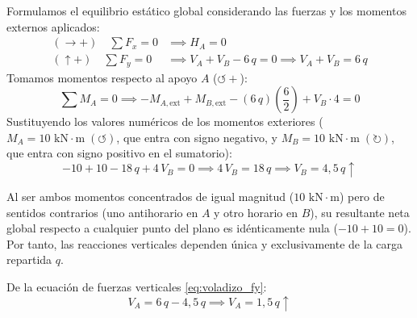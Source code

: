 Formulamos el equilibrio estático global considerando las fuerzas y los momentos externos aplicados:
\begin{align}
    (\rightarrow +) \quad \sum F_x = 0 & \implies \boxed{H_A = 0} \\[6pt]
    (\uparrow +) \quad \sum F_y = 0    & \implies V_A + V_B - 6\,q = 0 \implies V_A + V_B = 6\,q \label{eq:voladizo_fy}
\end{align}
Tomamos momentos respecto al apoyo $A$ ($\circlearrowleft +$):
\begin{equation}
    \sum M_A = 0 \implies -M_{A,\text{ext}} + M_{B,\text{ext}} - (6\,q)\left(\frac{6}{2}\right) + V_B \cdot 4 = 0
\end{equation}
Sustituyendo los valores numéricos de los momentos exteriores ($M_A = 10\text{ kN}\cdot\text{m}\;(\circlearrowleft)$, que entra con signo negativo, y $M_B = 10\text{ kN}\cdot\text{m}\;(\circlearrowright)$, que entra con signo positivo en el sumatorio):
\begin{equation}
    -10 + 10 - 18\,q + 4\,V_B = 0 \implies 4\,V_B = 18\,q \implies \boxed{V_B = 4{,}5\,q\uparrow}
\end{equation}
\begin{tcolorbox}[colback=yellow!10!white,colframe=orange!80!black,title=\textbf{Observación Clave sobre los Momentos Exteriores}]
    Al ser ambos momentos concentrados de igual magnitud ($10\text{ kN}\cdot\text{m}$) pero de sentidos contrarios (uno antihorario en $A$ y otro horario en $B$), su resultante neta global respecto a cualquier punto del plano es idénticamente nula ($-10 + 10 = 0$). Por tanto, las reacciones verticales dependen única y exclusivamente de la carga repartida $q$.
\end{tcolorbox}
De la ecuación de fuerzas verticales \eqref{eq:voladizo_fy}:
\begin{equation}
    V_A = 6\,q - 4{,}5\,q \implies \boxed{V_A = 1{,}5\,q\uparrow}
\end{equation}


